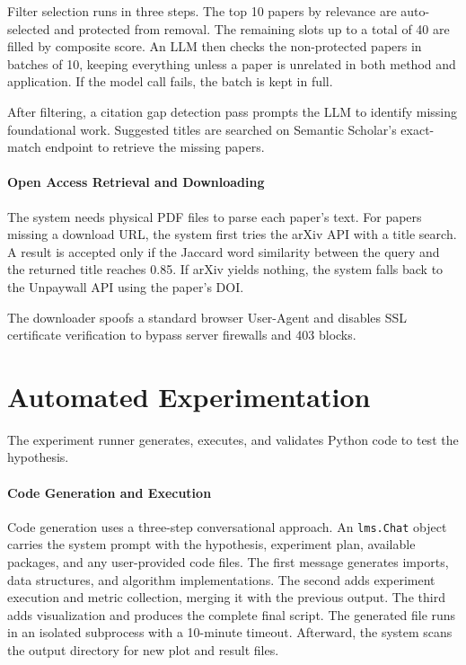 Filter selection runs in three steps.
The top 10 papers by relevance are auto-selected and protected from removal.
The remaining slots up to a total of 40 are filled by composite score.
An LLM then checks the non-protected papers in batches of 10, keeping everything unless a paper is unrelated in both method and application.
If the model call fails, the batch is kept in full.

After filtering, a citation gap detection pass prompts the LLM to identify missing foundational work.
Suggested titles are searched on Semantic Scholar's exact-match endpoint to retrieve the missing papers.

\paragraph{Open Access Retrieval and Downloading}
The system needs physical PDF files to parse each paper's text.
For papers missing a download URL, the system first tries the arXiv API with a title search.
A result is accepted only if the Jaccard word similarity between the query and the returned title reaches 0.85.
If arXiv yields nothing, the system falls back to the Unpaywall API using the paper's DOI.

The downloader spoofs a standard browser User-Agent and disables SSL certificate verification to bypass server firewalls and 403 blocks.




\section{Automated Experimentation}
The experiment runner generates, executes, and validates Python code to test the hypothesis.

\paragraph{Code Generation and Execution}
Code generation uses a three-step conversational approach.
An \texttt{lms.Chat} object carries the system prompt with the hypothesis, experiment plan, available packages, and any user-provided code files.
The first message generates imports, data structures, and algorithm implementations.
The second adds experiment execution and metric collection, merging it with the previous output.
The third adds visualization and produces the complete final script.
The generated file runs in an isolated subprocess with a 10-minute timeout.
Afterward, the system scans the output directory for new plot and result files.

